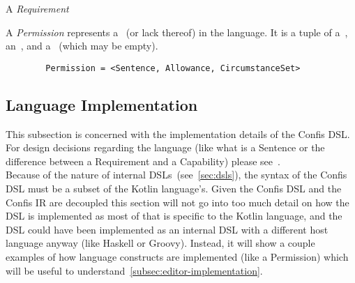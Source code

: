 \begin{definition}[Action]
    \label{def:action}
\end{definition}

\begin{definition}[Capability]
    \label{def:capability}
\end{definition}

\begin{definition}[Sentence]
    \label{def:sentence}
\end{definition}

\begin{definition}[Requirement]
    \label{def:requirement} A \emph{Requirement}
\end{definition}

\begin{definition}[Allowance]
    \label{def:allowance}
\end{definition}

\begin{definition}
    \label{def:circumstanceSet}
\end{definition}

\begin{definition}[Permission]
    \label{def:permission} A \emph{Permission} represents a~ (or lack thereof) in the language.
    It is a tuple of a~, an~, and a~ (which may be empty).
    \begin{verbatim}
        Permission = <Sentence, Allowance, CircumstanceSet>
    \end{verbatim}


\end{definition}

\subsection{Language Implementation}\label{subsec:dsl-implementation}

This subsection is concerned with the implementation details of the Confis DSL.
For design decisions regarding the language (like what is a Sentence or the difference between a Requirement and a Capability) please see~.\\

Because of the nature of internal DSLs~(see~\autoref{sec:dsls}), the syntax of the Confis DSL must be a subset of the Kotlin language's.
Given the Confis DSL and the Confis IR are decoupled this section will not go into too much detail on how the DSL is implemented as most of that is specific to the Kotlin language, and the DSL could have been implemented as an internal DSL with a different host language anyway (like Haskell or Groovy).
Instead, it will show a couple examples of how language constructs are implemented (like a Permission) which will be useful to understand~\autoref{subsec:editor-implementation}.

